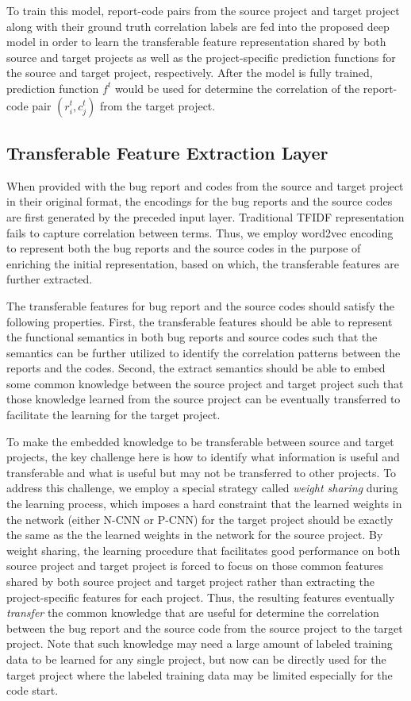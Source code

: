 To train this model, report-code pairs from the source project and target project along with their ground truth correlation labels are fed into the proposed deep model in order to learn the transferable feature representation shared by both source and target projects as well as the project-specific prediction functions for the source and target project, respectively. After the model is fully trained, prediction function $f^{t}$ would be used for determine the correlation of the report-code pair $(r_i^t, c_j^t)$ from the target project.

\subsection{Transferable Feature Extraction Layer}
When provided with the bug report and codes from the source and target project in their original format, the encodings for the bug reports and the source codes are first generated by the preceded input layer. Traditional TFIDF representation fails to capture correlation between terms. Thus, we employ word2vec encoding to represent both the bug reports and the source codes in the purpose of enriching the initial representation, based on which, the transferable features are further extracted.

The transferable features for bug report and the source codes should satisfy the following properties. First, the transferable features should be able to represent the functional semantics in both bug reports and source codes such that the semantics can be further utilized to identify the correlation patterns between the reports and the codes. Second, the extract semantics should be able to embed some common knowledge between the source project and target project such that those knowledge learned from the source project can be eventually transferred to facilitate the learning for the target project.

To make the embedded knowledge to be transferable between source and target projects, the key challenge here is how to identify what information is useful and transferable and what is useful but may not be transferred to other projects. To address this challenge, we employ a special strategy called \emph{weight sharing} during the learning process, which imposes a hard constraint that the learned weights in the network (either N-CNN or P-CNN) for the target project should be exactly the same as the the learned weights in the network for the source project. By weight sharing, the learning procedure that facilitates good performance on both source project and target project is forced to focus on those common features shared by both source project and target project rather than extracting the project-specific features for each project. Thus, the resulting features eventually \emph{transfer} the common knowledge that are useful for determine the correlation between the bug report and the source code from the source project to the target project. Note that such knowledge may need a large amount of labeled training data to be learned for any single project, but now can be directly used for the target project where the labeled training data may be limited especially for the code start. 

